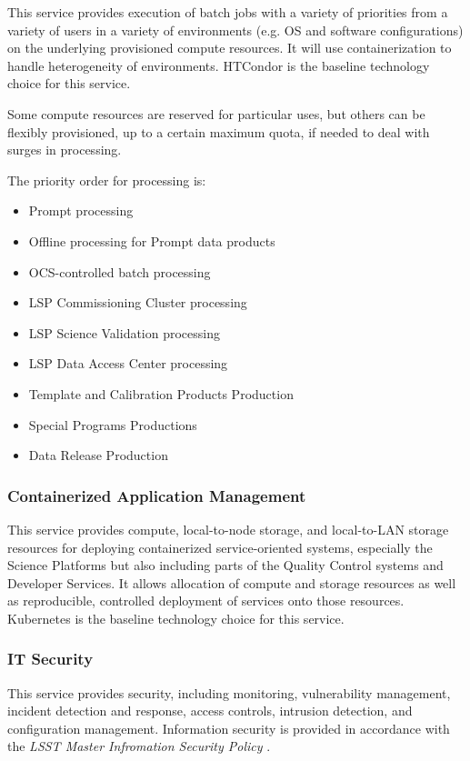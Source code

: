 \documentclass[DM,toc]{lsstdoc}
\begin{document}
This service provides execution of batch jobs with a variety of priorities from a variety of users in a variety of environments (e.g. OS and software configurations) on the underlying provisioned compute resources.
It will use containerization to handle heterogeneity of environments.
HTCondor is the baseline technology choice for this service.

Some compute resources are reserved for particular uses, but others can
be flexibly provisioned, up to a certain maximum quota, if needed to
deal with surges in processing.

The priority order for processing is:
\begin{itemize}
\item
  Prompt processing
\item
  Offline processing for Prompt data products
\item
  OCS-controlled batch processing
\item
  LSP Commissioning Cluster processing
\item
  LSP Science Validation processing
\item
  LSP Data Access Center processing
\item
  Template and Calibration Products Production
\item
  Special Programs Productions
\item
  Data Release Production
\end{itemize}

\subsubsection{Containerized Application Management}\label{containerized-application-management}

This service provides compute, local-to-node storage, and local-to-LAN storage resources for deploying containerized service-oriented systems, especially the Science Platforms but also including parts of the Quality Control systems and Developer Services.
It allows allocation of compute and storage resources as well as reproducible, controlled deployment of services onto those resources.
Kubernetes is the baseline technology choice for this service.

\subsubsection{IT Security}\label{it-security}

This service provides security, including monitoring, vulnerability management, incident detection and response, access controls, intrusion detection, and configuration management.
Information security is provided in accordance with the \textit{LSST Master Infromation Security Policy} .
\end{document}
